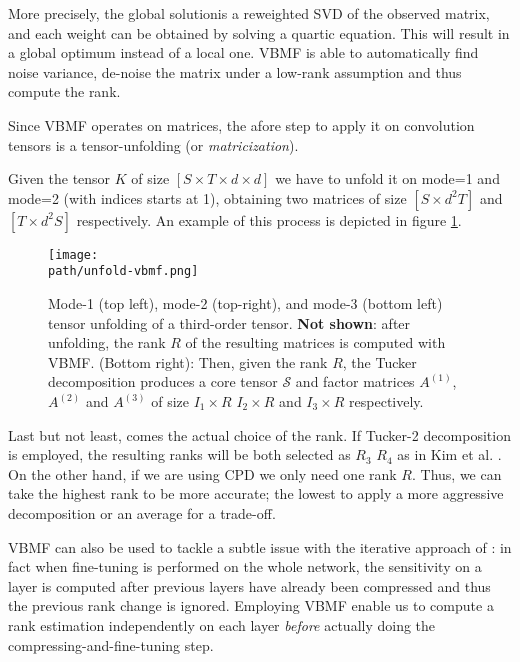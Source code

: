 More precisely, the global solutionis a reweighted SVD of the observed matrix, and each weight can be obtained by solving a quartic equation. This will result in a global optimum instead of a local one. VBMF is able to  automatically find noise variance, de-noise the matrix under a low-rank assumption and thus compute the rank. 
\newline

Since VBMF operates on matrices, the afore step to apply it on convolution tensors is a tensor-unfolding (or \emph{matricization}). 

Given the tensor $K$ of size $[S \times T \times d \times d]$ we have to unfold it on mode=1 and mode=2 (with indices starts at 1), obtaining two matrices of size $[S \times d^2T]$ and $[T \times d^2S]$ respectively. An example of this process is depicted in figure \ref{fig:vbmf}.

\begin{figure}[h!]
 \centering
 \texttt{[image: \\path/unfold-vbmf.png]} 
 \caption{Mode-1 (top left), mode-2 (top-right), and mode-3 (bottom left) tensor unfolding of a third-order tensor. \textbf{Not shown}: after unfolding, the rank $R$ of the resulting matrices is computed with VBMF.
 (Bottom right): Then, given the rank $R$, the Tucker decomposition produces a core tensor $\mathcal{S}$ and  factor matrices $A^(1)$, $A^(2)$ and $A^(3)$ of size $I_1 \times R$ $I_2 \times R$ and $I_3 \times R$ respectively. } 
 \label{fig:vbmf}
\end{figure}


Last but not least, comes the actual choice of the rank. If Tucker-2 decomposition is employed, the resulting ranks will be both selected as $R_3$ $R_4$ as in Kim et al. \parencite{Tucker-mobile}. On the other hand, if we are using CPD we only need one rank $R$. Thus, we can take the highest rank to be more accurate;
the lowest to apply a more aggressive decomposition or an average for a trade-off.
\newline 

VBMF can also be used to tackle a subtle issue with the iterative approach of \parencite{astrid2017}: in fact when fine-tuning is performed on the whole network, the sensitivity on a layer is computed after previous layers have already been compressed and thus the previous rank change is ignored. Employing VBMF enable us to compute a rank estimation independently on each layer \emph{before} actually doing the compressing-and-fine-tuning step. 


